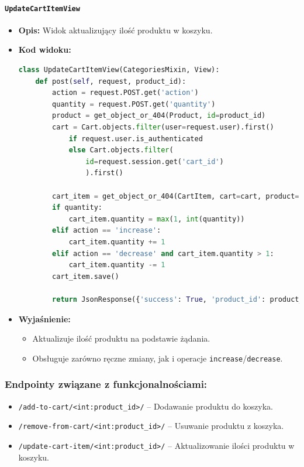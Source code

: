 \documentclass[12pt,a4paper,oneside]{article}
\theoremstyle{definition}
\numberwithin{equation}{section}
\begin{document}
\paragraph{\texttt{UpdateCartItemView}}
\begin{itemize}
    \item \textbf{Opis:} Widok aktualizujący ilość produktu w koszyku.
    \item \textbf{Kod widoku:}
\begin{lstlisting}[language=Python, caption=Kod widoku UpdateCartItemView]
class UpdateCartItemView(CategoriesMixin, View):
    def post(self, request, product_id):
        action = request.POST.get('action')
        quantity = request.POST.get('quantity')
        product = get_object_or_404(Product, id=product_id)
        cart = Cart.objects.filter(user=request.user).first() 
            if request.user.is_authenticated 
            else Cart.objects.filter(
                id=request.session.get('cart_id')
                ).first()

        cart_item = get_object_or_404(CartItem, cart=cart, product=product)
        if quantity:
            cart_item.quantity = max(1, int(quantity))
        elif action == 'increase':
            cart_item.quantity += 1
        elif action == 'decrease' and cart_item.quantity > 1:
            cart_item.quantity -= 1
        cart_item.save()

        return JsonResponse({'success': True, 'product_id': product_id, 'quantity': cart_item.quantity})
\end{lstlisting}

    \item \textbf{Wyjaśnienie:}
    \begin{itemize}
        \item Aktualizuje ilość produktu na podstawie żądania.
        \item Obsługuje zarówno ręczne zmiany, jak i operacje \texttt{increase}/\texttt{decrease}.
    \end{itemize}
\end{itemize}


\subsubsection{Endpointy związane z funkcjonalnościami:}
\begin{itemize}
    \item \texttt{/add-to-cart/<int:product\_id>/} – Dodawanie produktu do koszyka.
    \item \texttt{/remove-from-cart/<int:product\_id>/} – Usuwanie produktu z koszyka.
    \item \texttt{/update-cart-item/<int:product\_id>/} – Aktualizowanie ilości produktu w koszyku.
\end{itemize}
\end{document}
